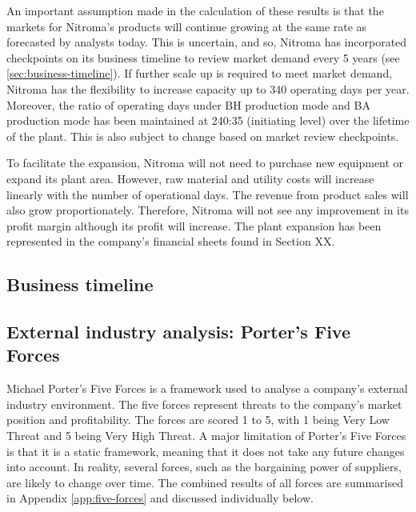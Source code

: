 An important assumption made in the calculation of these results is that the markets for Nitroma’s products will continue growing at the same rate as forecasted by analysts today. This is uncertain, and so, Nitroma has incorporated checkpoints on its business timeline to review market demand every 5 years (see \cref{sec:business-timeline}). If further scale up is required to meet market demand, Nitroma has the flexibility to increase capacity up to 340 operating days per year. Moreover, the ratio of operating days under BH production mode and BA production mode has been maintained at 240:35 (initiating level) over the lifetime of the plant. This is also subject to change based on market review checkpoints.

To facilitate the expansion, Nitroma will not need to purchase new equipment or expand its plant area. However, raw material and utility costs will increase linearly with the number of operational days. The revenue from product sales will also grow proportionately. Therefore, Nitroma will not see any improvement in its profit margin although its profit will increase. The plant expansion has been represented in the company’s financial sheets found in Section XX.

\subsection{Business timeline}

\subsection{External industry analysis: Porter's Five Forces}
\label{sec:five-forces}
Michael Porter’s Five Forces is a framework used to analyse a company’s external industry environment. The five forces represent threats to the company’s market position and profitability. The forces are scored 1 to 5, with 1 being Very Low Threat and 5 being Very High Threat. A major limitation of Porter’s Five Forces is that it is a static framework, meaning that it does not take any future changes into account. In reality, several forces, such as the bargaining power of suppliers, are likely to change over time. The combined results of all forces are summarised in Appendix \ref{app:five-forces} and discussed individually below.

